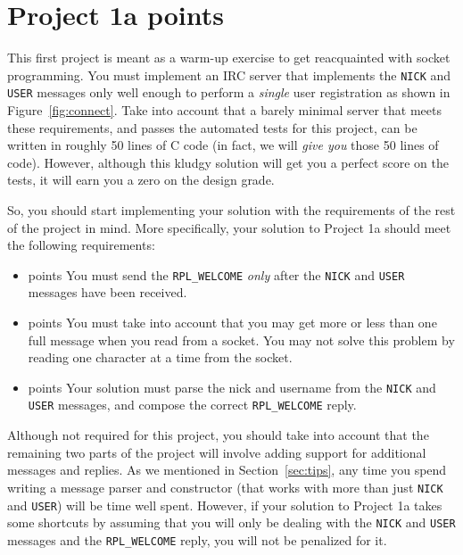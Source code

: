 \documentclass[10pt]{article}
\newcommand{\points}[1]{{\sffamily\mdseries\guillemotleft #1 points\guillemotright{}}}
\begin{document}
\pagebreak


\section{Project 1a \points{50}}
\label{sec:proj1a}

This first project is meant as a warm-up exercise to get reacquainted with socket programming. You must implement an IRC server that implements the \texttt{NICK} and \texttt{USER} messages only well enough to perform a \emph{single} user registration as shown in Figure~\ref{fig:connect}. Take into account that a barely minimal server that meets these requirements, and passes the automated tests for this project, can be written in roughly 50 lines of C code (in fact, we will \emph{give you} those 50 lines of code). However, although this kludgy solution will get you a perfect score on the tests, it will earn you a zero on the design grade.

So, you should start implementing your solution with the requirements of the rest of the project in mind. More specifically, your solution to Project 1a should meet the following requirements:

\begin{itemize}
\item \points{12.5} You must send the \texttt{RPL\_WELCOME} \emph{only} after the \texttt{NICK} and \texttt{USER} messages have been received.
\item \points{25} You must take into account that you may get more or less than one full message when you read from a socket. You may not solve this problem by reading one character at a time from the socket.
\item \points{12.5} Your solution must parse the nick and username from the \texttt{NICK} and \texttt{USER} messages, and compose the correct \texttt{RPL\_WELCOME} reply.
\end{itemize}

Although not required for this project, you should take into account that the remaining two parts of the project will involve adding support for additional messages and replies. As we mentioned in Section~\ref{sec:tips}, any time you spend writing a message parser and constructor (that works with more than just \texttt{NICK} and \texttt{USER}) will be time well spent. However, if your solution to Project 1a takes some shortcuts by assuming that you will only be dealing with the \texttt{NICK} and \texttt{USER} messages and the \texttt{RPL\_WELCOME} reply, you will not be penalized for it.
\end{document}
